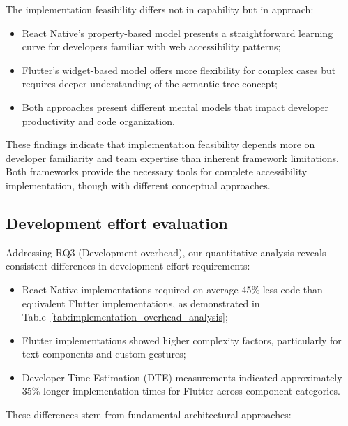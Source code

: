 The implementation feasibility differs not in capability but in approach:

\begin{itemize}
    \item React Native's property-based model presents a straightforward learning curve for developers familiar with web accessibility patterns;
    
    \item Flutter's widget-based model offers more flexibility for complex cases but requires deeper understanding of the semantic tree concept;
    
    \item Both approaches present different mental models that impact developer productivity and code organization.
\end{itemize}

These findings indicate that implementation feasibility depends more on developer familiarity and team expertise than inherent framework limitations. Both frameworks provide the necessary tools for complete accessibility implementation, though with different conceptual approaches.

\subsection{Development effort evaluation}
\label{subsec:development-effort}

Addressing RQ3 (Development overhead), our quantitative analysis reveals consistent differences in development effort requirements:

\begin{itemize}
    \item React Native implementations required on average 45\% less code than equivalent Flutter implementations, as demonstrated in Table~\ref{tab:implementation_overhead_analysis};
    
    \item Flutter implementations showed higher complexity factors, particularly for text components and custom gestures;
    
    \item Developer Time Estimation (DTE) measurements indicated approximately 35\% longer implementation times for Flutter across component categories.
\end{itemize}

These differences stem from fundamental architectural approaches:

